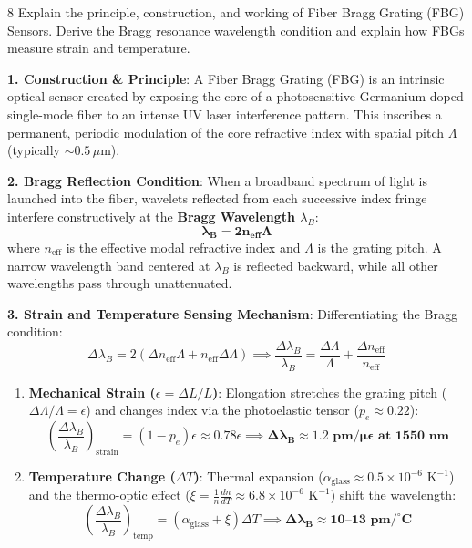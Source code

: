 \begin{theoryq}{8}
Explain the principle, construction, and working of Fiber Bragg Grating (FBG) Sensors. Derive the Bragg resonance wavelength condition and explain how FBGs measure strain and temperature.
\end{theoryq}
\begin{theorysol}
\textbf{1. Construction \& Principle}:
A Fiber Bragg Grating (FBG) is an intrinsic optical sensor created by exposing the core of a photosensitive Germanium-doped single-mode fiber to an intense UV laser interference pattern.
This inscribes a permanent, periodic modulation of the core refractive index with spatial pitch $\Lambda$ (typically $\sim 0.5\,\mu\text{m}$).

\textbf{2. Bragg Reflection Condition}:
When a broadband spectrum of light is launched into the fiber, wavelets reflected from each successive index fringe interfere constructively at the \textbf{Bragg Wavelength $\lambda_B$}:
\begin{equation}
\mathbf{\lambda_B = 2 n_{\text{eff}} \Lambda}
\end{equation}
where $n_{\text{eff}}$ is the effective modal refractive index and $\Lambda$ is the grating pitch.
A narrow wavelength band centered at $\lambda_B$ is reflected backward, while all other wavelengths pass through unattenuated.

\textbf{3. Strain and Temperature Sensing Mechanism}:
Differentiating the Bragg condition:
\begin{equation}
\Delta\lambda_B = 2\left(\Delta n_{\text{eff}} \Lambda + n_{\text{eff}} \Delta\Lambda\right) \implies \frac{\Delta\lambda_B}{\lambda_B} = \frac{\Delta\Lambda}{\Lambda} + \frac{\Delta n_{\text{eff}}}{n_{\text{eff}}}
\end{equation}
\begin{enumerate}
    \item \textbf{Mechanical Strain ($\epsilon = \Delta L/L$)}:
    Elongation stretches the grating pitch ($\Delta\Lambda/\Lambda = \epsilon$) and changes index via the photoelastic tensor ($p_e \approx 0.22$):
    \begin{equation}
    \left(\frac{\Delta\lambda_B}{\lambda_B}\right)_{\text{strain}} = (1 - p_e)\epsilon \approx 0.78 \epsilon \implies \mathbf{\Delta\lambda_B \approx 1.2\text{ pm}/\mu\epsilon \text{ at } 1550\text{ nm}}
    \end{equation}
    \item \textbf{Temperature Change ($\Delta T$)}:
    Thermal expansion ($\alpha_{\text{glass}} \approx 0.5 \times 10^{-6}\text{ K}^{-1}$) and the thermo-optic effect ($\xi = \frac{1}{n}\frac{dn}{dT} \approx 6.8 \times 10^{-6}\text{ K}^{-1}$) shift the wavelength:
    \begin{equation}
    \left(\frac{\Delta\lambda_B}{\lambda_B}\right)_{\text{temp}} = (\alpha_{\text{glass}} + \xi)\Delta T \implies \mathbf{\Delta\lambda_B \approx 10\text{--}13\text{ pm}/^\circ\text{C}}
    \end{equation}
\end{enumerate}


\end{theorysol}
